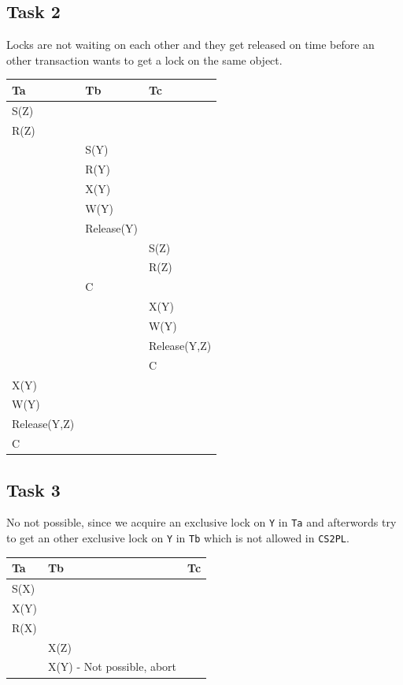 \documentclass[12pt,a4paper]{article}
\begin{document}
\subsection{Task 2}
Locks are not waiting on each other and they get released on time before an other transaction wants to get a lock on the same object.
\begin{table}[!htbp]
    \centering
    \begin{tabularx}{\textwidth}{l|l|l}
        \hline
        Ta & Tb & Tc \\ 
        \hline
        S(Z) &  &  \\
        R(Z) &  &  \\      
             & S(Y) & \\
             & R(Y) & \\
             & X(Y) & \\             
             & W(Y) & \\
			 & Release(Y) & \\
             &  		& S(Z)\\             
        	 &  		& R(Z)\\      	 
       		& C 		& \\        	 
        	& 			& X(Y) \\       		
        	& 			& W(Y) \\
			& 			& Release(Y,Z) \\
        	& & C \\ 
		X(Y) & &  \\  
        W(Y) & &  \\ 
		Release(Y,Z) & &  \\ 
        C & &  \\   
        \hline
    \end{tabularx}
\end{table}
\subsection{Task 3}
No not possible, since we acquire an exclusive lock on \texttt{Y} in \texttt{Ta} and afterwords try to get an other exclusive lock on \texttt{Y} in \texttt{Tb} which is not allowed in \texttt{CS2PL}.
\begin{table}[!htbp]
    \centering
    \begin{tabularx}{\textwidth}{l|l|l}
        \hline
        Ta & Tb & Tc \\ 
        \hline
        S(X) &  &  \\
        X(Y) &  &  \\
        R(X) &  &  \\
        	 & X(Z) &  \\
   			 & X(Y) - Not possible, abort &  \\          
        \hline
    \end{tabularx}
\end{table}
\end{document}
